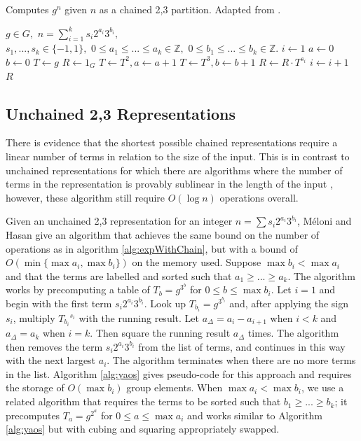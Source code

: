 \documentclass{ucalgthes1}
\theoremstyle{definition}
\newcommand{\ZZ}{\mathbb{Z}}
\begin{document}
\begin{algorithm}[h]
\caption{Computes $g^n$ given $n$ as a chained 2,3 partition. Adapted from \cite{Dimitrov2005}.}
\label{alg:expWithChain}
\begin{algorithmic}[1]
\REQUIRE $g \in G,$ 
$n = \sum_{i=1}^k s_i2^{a_i}3^{b_i},$ \\
$s_1,...,s_k \in \{-1, 1\},$ 
$0 \le a_1 \le ...\le a_k \in \ZZ,$ 
$0 \le b_1 \le ... \le b_k \in \ZZ.$
\STATE $i \gets 1$
\STATE $a \gets 0$ 
\STATE $b \gets 0$ 
\STATE $T \gets g$ 
\STATE $R \gets 1_G$
		\STATE $T \gets T^2, a \gets a + 1$
	\ENDWHILE
		\STATE $T \gets T^3, b \gets b + 1$
	\ENDWHILE
	\STATE $R \gets R \cdot T^{s_i}$ 
	\STATE $i \gets i + 1$
\ENDWHILE
\RETURN $R$
\end{algorithmic}
\end{algorithm}


\subsection{Unchained 2,3 Representations}

There is evidence \cite{Imbert2010} that the shortest possible chained representations require a linear number of terms in relation to the size of the input.  This is in contrast to unchained representations for which there are algorithms where the number of terms in the representation is provably sublinear in the length of the input \cite{Dimitrov2008, Ciet2005}, however, these algorithm still require $O(\log n)$ operations overall.

Given an unchained 2,3 representation for an integer $n = \sum s_i 2^{a_i} 3^{b_i}$, M\'{e}loni and Hasan \cite[Section 3.2]{Meloni2009} give an algorithm that achieves the same bound on the number of operations as in algorithm \ref{alg:expWithChain}, but with a bound of $O(\min \{\max a_i, \max b_i\})$ on the memory used.  Suppose $\max b_i < \max a_i$ and that the terms are labelled and sorted such that $a_1 \ge ... \ge a_k$.  The algorithm works by precomputing a table of $T_b = g^{3^b}$ for $0 \le b \le \max b_i$.  Let $i=1$ and begin with the first term $s_i2^{a_i}3^{b_i}$.  Look up $T_{b_i} = g^{3^{b_i}}$ and, after applying the sign $s_i$, multiply ${T_{b_i}}^{s_i}$ with the running result.  Let $a_\Delta = a_i - a_{i+1}$ when $i < k$ and $a_\Delta = a_k$ when $i = k$.  Then square the running result $a_\Delta$ times.  The algorithm then removes the term $s_i2^{a_i}3^{b_i}$ from the list of terms, and continues in this way with the next largest $a_i$.  The algorithm terminates when there are no more terms in the list.  Algorithm  \ref{alg:yaos} gives pseudo-code for this approach and requires the storage of $O(\max b_i)$ group elements.  When $\max a_i < \max b_i$, we use a related algorithm that requires the terms to be sorted such that $b_1 \ge ... \ge b_k$; it precomputes $T_a = g^{2^a}$ for $0 \le a \le \max a_i$ and works similar to Algorithm \ref{alg:yaos} but with cubing and squaring appropriately swapped.
\end{document}
